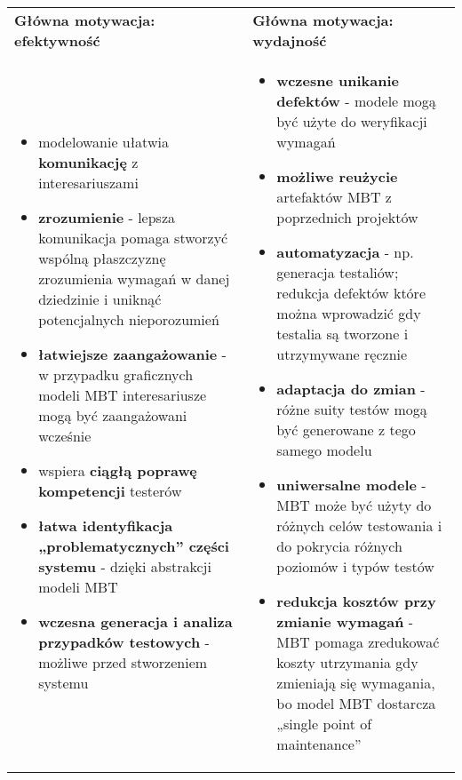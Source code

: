\documentclass[../main.tex]{subfiles}
\begin{document}
    \begin{table}[H]
        \begin{center}
            \begin{tabular}{p{8cm} p{8cm}}
                \textbf{Główna motywacja: efektywność} & \textbf{Główna motywacja: wydajność} \\
                \begin{itemize}
                    \item modelowanie ułatwia \textbf{komunikację} z interesariuszami
                    \item \textbf{zrozumienie} - lepsza komunikacja pomaga stworzyć wspólną
                    płaszczyznę zrozumienia wymagań w danej dziedzinie i uniknąć potencjalnych nieporozumień
                    \item \textbf{łatwiejsze zaangażowanie} - w przypadku graficznych modeli MBT interesariusze
                    mogą być zaangażowani wcześnie
                    \item wspiera \textbf{ciągłą poprawę kompetencji} testerów
                    \item \textbf{łatwa identyfikacja „problematycznych” części systemu} - dzięki abstrakcji modeli MBT
                    \item \textbf{wczesna generacja i analiza przypadków testowych} - możliwe przed stworzeniem systemu
                \end{itemize}
                &
                \begin{itemize}
                    \item \textbf{wczesne unikanie defektów} - modele mogą być użyte do weryfikacji wymagań
                    \item \textbf{możliwe reużycie} artefaktów MBT z poprzednich projektów
                    \item \textbf{automatyzacja} - np. generacja testaliów; redukcja defektów które można
                    wprowadzić gdy testalia są tworzone i utrzymywane ręcznie
                    \item \textbf{adaptacja do zmian} - różne suity testów mogą być generowane z tego samego modelu
                    \item \textbf{uniwersalne modele} - MBT może być użyty do różnych celów testowania i do pokrycia
                    różnych poziomów i typów testów
                    \item \textbf{redukcja kosztów przy zmianie wymagań} - MBT pomaga zredukować koszty utrzymania gdy
                    zmieniają się wymagania, bo model MBT dostarcza „single point of maintenance”
                \end{itemize} \\
            \end{tabular}
        \end{center}
    \end{table}
\end{document}
